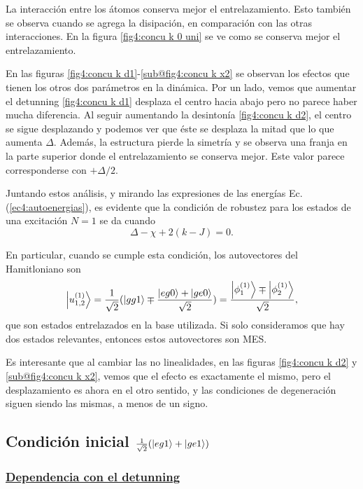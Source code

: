 La interacción entre los átomos conserva mejor el entrelazamiento. Esto también se observa cuando se agrega la disipación, en comparación con las otras interacciones. En la figura \ref{fig4:concu k 0 uni} se ve como se conserva mejor el entrelazamiento.

En las figuras \ref{fig4:concu k d1}-\ref{sub@fig4:concu k x2} se observan los efectos que tienen los otros dos parámetros en la dinámica. Por un lado, vemos que aumentar el detunning \ref{fig4:concu k d1} desplaza el centro hacia abajo pero no parece haber mucha diferencia. Al seguir aumentando la desintonía \ref{fig4:concu k d2}, el centro se sigue desplazando y podemos ver que éste se desplaza la mitad que lo que aumenta $\Delta$. Además, la estructura pierde la simetría y se observa una franja en la parte superior donde el entrelazamiento se conserva mejor. Este valor parece corresponderse con $+\Delta/2$. 

Juntando estos análisis, y mirando las expresiones de las energías Ec. (\ref{ec4:autoenergias}), es evidente que la condición de robustez para los estados de una excitación $N=1$ se da cuando
\begin{equation}
    \label{ec4:condicion0}
    \Delta-\chi+2(k-J)=0.
\end{equation}

En particular, cuando se cumple esta condición, los autovectores del Hamitloniano son
\begin{equation}
    \ket{u_{1,2}^{(1)}}=\frac{1}{\sqrt{2}}(\ket{gg1}\mp \frac{\ket{eg0}+\ket{ge0}}{\sqrt{2}})=\frac{\ket{\phi_1^{(1)}}\mp\ket{\phi_2^{(1)}}}{\sqrt{2}},
\end{equation}
que son estados entrelazados en la base utilizada. Si solo consideramos que hay dos estados relevantes, entonces estos autovectores son MES.

Es interesante que al cambiar las no linealidades, en las figuras \ref{fig4:concu k d2} y \ref{sub@fig4:concu k x2}, vemos que el efecto es exactamente el mismo, pero el desplazamiento es ahora en el otro sentido, y las condiciones de degeneración siguen siendo las mismas, a menos de un signo.
\subsection{Condición inicial $\frac{1}{\sqrt{2}}(\ket{eg1}+\ket{ge1})$}

\subsubsection{\underline{Dependencia con el detunning}}

